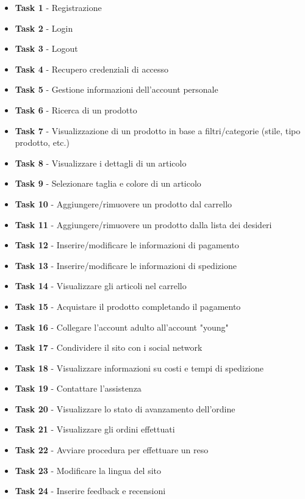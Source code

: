 \documentclass[12pt,a4paper]{report}
\begin{document}
\begin{itemize}
  \item \textbf{Task 1} - Registrazione
  \item \textbf{Task 2} - Login
  \item \textbf{Task 3} - Logout
  \item \textbf{Task 4} - Recupero credenziali di accesso
  \item \textbf{Task 5} - Gestione informazioni dell'account personale
  \item \textbf{Task 6} - Ricerca di un prodotto
  \item \textbf{Task 7} - Visualizzazione di un prodotto in base a filtri/categorie (stile, tipo prodotto, etc.)
  \item \textbf{Task 8} - Visualizzare i dettagli di un articolo
  \item \textbf{Task 9} - Selezionare taglia e colore di un articolo
  \item \textbf{Task 10} - Aggiungere/rimuovere un prodotto dal carrello
  \item \textbf{Task 11} - Aggiungere/rimuovere un prodotto dalla lista dei desideri
  \item \textbf{Task 12} - Inserire/modificare le informazioni di pagamento
  \item \textbf{Task 13} - Inserire/modificare le informazioni di spedizione
  \item \textbf{Task 14} - Visualizzare gli articoli nel carrello
  \item \textbf{Task 15} - Acquistare il prodotto completando il pagamento
  \item \textbf{Task 16} - Collegare l'account adulto all'account "young"
  \item \textbf{Task 17} - Condividere il sito con i social network
  \item \textbf{Task 18} - Visualizzare informazioni su costi e tempi di spedizione
  \item \textbf{Task 19} - Contattare l'assistenza
  \item \textbf{Task 20} - Visualizzare lo stato di avanzamento dell'ordine
  \item \textbf{Task 21} - Visualizzare gli ordini effettuati
  \item \textbf{Task 22} - Avviare procedura per effettuare un reso
  \item \textbf{Task 23} - Modificare la lingua del sito
  \item \textbf{Task 24} - Inserire feedback e recensioni
\end{itemize}
\end{document}
